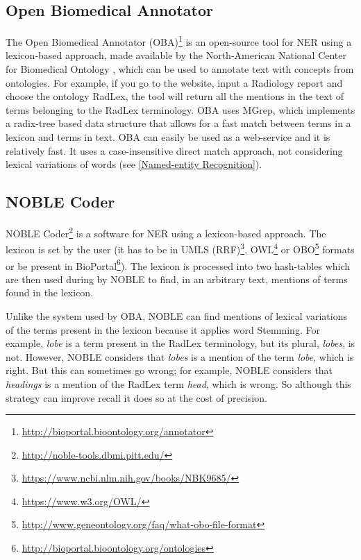 \subsection{Open Biomedical Annotator}

The Open Biomedical Annotator (OBA)\footnote{\url{http://bioportal.bioontology.org/annotator}} is an open-source tool for NER using a lexicon-based approach, made available by the North-American National Center for Biomedical Ontology \citep{Jonquet2009}, which can be used to annotate text with concepts from ontologies. For example, if you go to the website, input a Radiology report and choose the ontology RadLex, the tool will return all the mentions in the text of terms belonging to the RadLex terminology. OBA uses MGrep, which implements a radix-tree based data structure that allows for a fast match between terms in a lexicon and terms in text. OBA can easily be used as a web-service and it is relatively fast. It uses a case-insensitive direct match approach, not considering lexical variations of words (see \ref{Named-entity Recognition}).

\subsection{NOBLE Coder}
\label{NOBLE Coder}

NOBLE Coder\footnote{\url{http://noble-tools.dbmi.pitt.edu/}} \citep{Tseytlin2016} is a software for NER using a lexicon-based approach. The lexicon is set by the user (it  has to be in UMLS (RRF)\footnote{\url{https://www.ncbi.nlm.nih.gov/books/NBK9685/}}, OWL\footnote{\url{https://www.w3.org/OWL/}} or OBO\footnote{\url{http://www.geneontology.org/faq/what-obo-file-format}} formats or be present in BioPortal\footnote{\url{http://bioportal.bioontology.org/ontologies}}). The lexicon is processed into two hash-tables which are then used during by NOBLE to find, in an arbitrary text, mentions of terms found in the lexicon.

Unlike the system used by OBA, NOBLE can find mentions of lexical variations of the terms present in the lexicon because it applies word Stemming. For example, \textit{lobe} is a term present in the RadLex terminology, but its plural, \textit{lobes}, is not. However, NOBLE considers that \textit{lobes} is a mention of the term \textit{lobe}, which is right. But this can sometimes go wrong; for example, NOBLE considers that \textit{headings} is a mention of the RadLex term \textit{head}, which is wrong. So although this strategy can improve recall it does so at the cost of precision.

